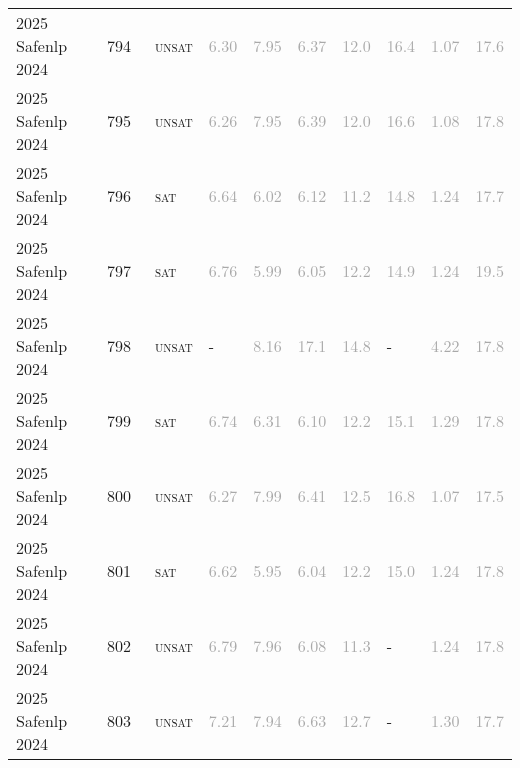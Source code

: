\begin{center}
{\begin{longtable}{@{}llllllllll@{}}
2025 Safenlp 2024 & 794 & ~\textsc{unsat} & \textcolor{darkgray}{6.30} & \textcolor{darkgray}{7.95} & \textcolor{darkgray}{6.37} & \textcolor{darkgray}{12.0} & \textcolor{darkgray}{16.4} & \textcolor{darkgray}{1.07} & \textcolor{darkgray}{17.6} \\
2025 Safenlp 2024 & 795 & ~\textsc{unsat} & \textcolor{darkgray}{6.26} & \textcolor{darkgray}{7.95} & \textcolor{darkgray}{6.39} & \textcolor{darkgray}{12.0} & \textcolor{darkgray}{16.6} & \textcolor{darkgray}{1.08} & \textcolor{darkgray}{17.8} \\
2025 Safenlp 2024 & 796 & ~\textsc{sat} & \textcolor{darkgray}{6.64} & \textcolor{darkgray}{6.02} & \textcolor{darkgray}{6.12} & \textcolor{darkgray}{11.2} & \textcolor{darkgray}{14.8} & \textcolor{darkgray}{1.24} & \textcolor{darkgray}{17.7} \\
2025 Safenlp 2024 & 797 & ~\textsc{sat} & \textcolor{darkgray}{6.76} & \textcolor{darkgray}{5.99} & \textcolor{darkgray}{6.05} & \textcolor{darkgray}{12.2} & \textcolor{darkgray}{14.9} & \textcolor{darkgray}{1.24} & \textcolor{darkgray}{19.5} \\
2025 Safenlp 2024 & 798 & ~\textsc{unsat} & - & \textcolor{darkgray}{8.16} & \textcolor{darkgray}{17.1} & \textcolor{darkgray}{14.8} & - & \textcolor{darkgray}{4.22} & \textcolor{darkgray}{17.8} \\
2025 Safenlp 2024 & 799 & ~\textsc{sat} & \textcolor{darkgray}{6.74} & \textcolor{darkgray}{6.31} & \textcolor{darkgray}{6.10} & \textcolor{darkgray}{12.2} & \textcolor{darkgray}{15.1} & \textcolor{darkgray}{1.29} & \textcolor{darkgray}{17.8} \\
2025 Safenlp 2024 & 800 & ~\textsc{unsat} & \textcolor{darkgray}{6.27} & \textcolor{darkgray}{7.99} & \textcolor{darkgray}{6.41} & \textcolor{darkgray}{12.5} & \textcolor{darkgray}{16.8} & \textcolor{darkgray}{1.07} & \textcolor{darkgray}{17.5} \\
2025 Safenlp 2024 & 801 & ~\textsc{sat} & \textcolor{darkgray}{6.62} & \textcolor{darkgray}{5.95} & \textcolor{darkgray}{6.04} & \textcolor{darkgray}{12.2} & \textcolor{darkgray}{15.0} & \textcolor{darkgray}{1.24} & \textcolor{darkgray}{17.8} \\
2025 Safenlp 2024 & 802 & ~\textsc{unsat} & \textcolor{darkgray}{6.79} & \textcolor{darkgray}{7.96} & \textcolor{darkgray}{6.08} & \textcolor{darkgray}{11.3} & - & \textcolor{darkgray}{1.24} & \textcolor{darkgray}{17.8} \\
2025 Safenlp 2024 & 803 & ~\textsc{unsat} & \textcolor{darkgray}{7.21} & \textcolor{darkgray}{7.94} & \textcolor{darkgray}{6.63} & \textcolor{darkgray}{12.7} & - & \textcolor{darkgray}{1.30} & \textcolor{darkgray}{17.7} \\

\end{longtable}}
\end{center}
